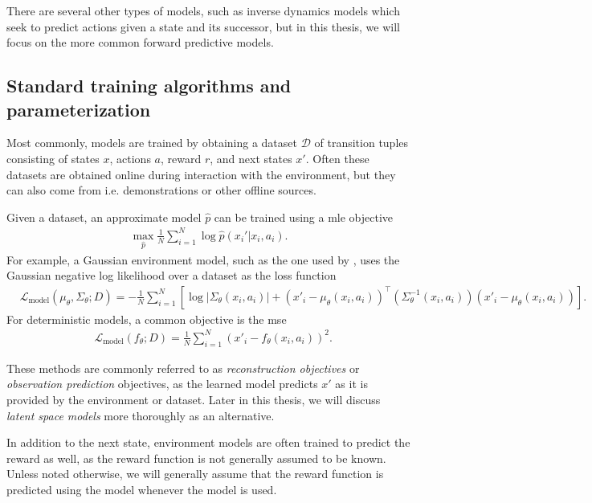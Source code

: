 There are several other types of models, such as inverse dynamics models which seek to predict actions given a state and its successor, but in this thesis, we will focus on the more common forward predictive models.

\subsection{Standard training algorithms and parameterization}

Most commonly, models are trained by obtaining a dataset $\mathcal{D}$ of transition tuples consisting of states $x$, actions $a$, reward $r$, and next states $x'$. 
Often these datasets are obtained online during interaction with the environment, but they can also come from i.e. demonstrations or other offline sources.

Given a dataset, an approximate model $\hat{p}$ can be trained using a \ac{mle} objective 
\begin{align}
\max_{\hat{p}} \frac{1}{N}\sum_{i=1}^N \log \hat{p}(x_i'|x_i,a_i).
\end{align}
For example, a Gaussian environment model, such as the one used by \textcite{pets,mbpo,voelcker2022value}, uses the Gaussian negative log likelihood over a dataset as the loss function
\begin{align}
    &\mathcal{L}_\mathrm{model}(\mu_\theta, \Sigma_\theta; D) = - \frac{1}{N} \sum_{i=1}^N \left[\log |\Sigma_\theta(x_i, a_i)| + (x'_i - \mu_\theta(x_i, a_i))^\top \left(\Sigma^{-1}_\theta(x_i, a_i) \right) (x'_i - \mu_\theta(x_i, a_i)) \right].
\end{align}
For deterministic models, a common objective is the \ac{mse}
\begin{align}
    &\mathcal{L}_\mathrm{model}(f_\theta; D) = \frac{1}{N} \sum_{i=1}^N (x'_i - f_\theta(x_i, a_i))^2.
\end{align}

These methods are commonly referred to as \emph{reconstruction objectives} or \emph{observation prediction} objectives, as the learned model predicts $x'$ as it is provided by the environment or dataset.
Later in this thesis, we will discuss \emph{latent space models} more thoroughly as an alternative.

In addition to the next state, environment models are often trained to predict the reward as well, as the reward function is not generally assumed to be known.
Unless noted otherwise, we will generally assume that the reward function is predicted using the model whenever the model is used.

